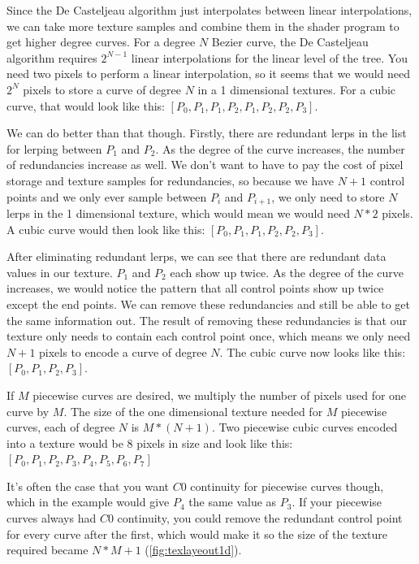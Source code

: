 \documentclass{jcgt}
\begin{document}
Since the De Casteljeau algorithm just interpolates between linear interpolations, we can take more texture samples and combine them in the shader program to get higher degree curves.  For a degree $N$ Bezier curve, the De Casteljeau algorithm requires $2^{N-1}$ linear interpolations for the linear level of the tree.  You need two pixels to perform a linear interpolation, so it seems that we would need $2^N$ pixels to store a curve of degree $N$ in a 1 dimensional textures.  For a cubic curve, that would look like this: $[P_0,P_1,P_1,P_2,P_1,P_2,P_2,P_3]$.

We can do better than that though.  Firstly, there are redundant lerps in the list for lerping between $P_1$ and $P_2$.  As the degree of the curve increases, the number of redundancies increase as well.  We don't want to have to pay the cost of pixel storage and texture samples for redundancies, so because we have $N+1$ control points and we only ever sample between  $P_i$ and $P_{i+1}$, we only need to store $N$ lerps in the 1 dimensional texture, which would mean we would need $N*2$ pixels.  A cubic curve would then look like this:  $[P_0,P_1,P_1,P_2,P_2,P_3]$.

After eliminating redundant lerps, we can see that there are redundant data values in our texture.  $P_1$ and $P_2$ each show up twice.  As the degree of the curve increases, we would notice the pattern that all control points show up twice except the end points.  We can remove these redundancies and still be able to get the same information out.  The result of removing these redundancies is that our texture only needs to contain each control point once, which means we only need $N+1$ pixels to encode a curve of degree $N$.  The cubic curve now looks like this: $[P_0,P_1,P_2,P_3]$. 

If $M$ piecewise curves are desired, we multiply the number of pixels used for one curve by $M$.  The size of the one dimensional texture needed for $M$ piecewise curves, each of degree $N$ is $M*(N+1)$. Two piecewise cubic curves encoded into a texture would be 8 pixels in size and look like this: $[P_0,P_1,P_2,P_3,P_4,P_5,P_6,P_7]$

It's often the case that you want $C0$ continuity for piecewise curves though, which in the example would give $P_4$ the same value as $P_3$.  If your piecewise curves always had $C0$ continuity, you could remove the redundant control point for every curve after the first, which would make it so the size of the texture required became $N*M+1$ (\autoref{fig:texlayeout1d}).
\end{document}
